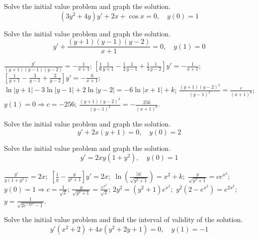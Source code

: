 \documentclass{ximera}
\begin{document}
\begin{problem}\label{exer:2.2.13} Solve the initial value problem and graph the solution.
$$(3y^2+4y)y'+2x+\cos x=0, \quad y(0)=1$$
\end{problem}

\begin{problem}\label{exer:2.2.14} Solve the initial value problem and graph the solution.
$$y'+\frac{(y+1)(y-1)(y-2)}{x+1}=0, \quad y(1)=0$$

 

\begin{solution}
    $\frac{y'}{(y+1)(y-1)(y-2)}=-\frac{1}{ x+1}$;\;
$\left[\frac{1}{6}\frac{1}{ y+1}-\frac{1}{2}\frac{1}{
y-1}+\frac{1}{3}\frac{1}{ y-2}\right]y'=-\frac{1}{ x+1}$;\;
$\left[\frac{1}{ y+1}-\frac{3}{ y-1}+\frac{2}{
y-2}\right]y'=-\frac{6}{ x+1}$;\;
$\ln|y+1|-3\ln|y-1|+2\ln|y-2|=-6\ln|x+1|+k$;\;
$\frac{(y+1)(y-2)^2}{(y-1)^3}=\frac{c}{(x+1)^6}$;\;
$y(1)=0\Rightarrow c=-256$;\;
$\frac{(y+1)(y-2)^2}{(y-1)^3}=-\frac{256}{(x+1)^6}$.
\end{solution}
\end{problem}

\begin{problem}\label{exer:2.2.15} Solve the initial value problem and graph the solution.
$$y'+2x(y+1)=0, \quad y(0)=2$$
\end{problem}

\begin{problem}\label{exer:2.2.16} Solve the initial value problem and graph the solution.
$$y'=2xy(1+y^2),\quad y(0)=1$$

 

\begin{solution}
    $\frac{y'}{ y(1+y^2)}=2x$;\ $\left[\frac{1}{ y}-\frac{y}{
y^2+1}\right]y'=2x$;\ $\ln\left(\frac{|y|}{
\sqrt{y^2+1}}\right)=x^2+k$;\ $\frac{y}{
\sqrt{y^2+1}}=ce^{x^2}$;\ $y(0)=1\Rightarrow c=\frac{1}{\sqrt2}$;\;
$\frac{y}{\sqrt{y^2+1}}=\frac{e^{x^2}}{\sqrt2}$;\;
$2y^2=(y^2+1)e^{x^2}$;\ $y^2(2-e^{x^2})=e^{2x^2}$;
$y=\frac{1}{\sqrt{2e^{-2x^2}-1}}$.
\end{solution}
\end{problem}

\begin{problem}\label{exer:2.2.17} Solve the initial value problem and find the interval of validity of the solution.
$$y'(x^2+2)+ 4x(y^2+2y+1)=0, \quad y(1)=-1$$
\end{problem}
\end{document}
